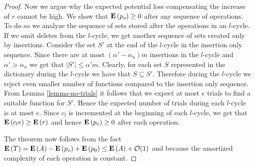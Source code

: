 \begin{proof}
Now we argue why the expected potential loss compensating the increase of $r$ cannot be high.
We show that $\mathbf{E}\left(p_o\right) \geq 0$ after any sequence of operations.
To do so we analyze the sequence of sets stored after the operations in an $l$-cycle.
If we omit deletes from the $l$-cycle, we get another sequence of sets created only by insertions.
Consider the set $S'$ at the end of the $l$-cycle in the insertion only sequence. 
Since there are at most $(\alpha' - \alpha_u)m$ insertions in the $l$-cycle and $\alpha' > \alpha_u$ we get that $|S'| \leq \alpha' m$.
Clearly, for each set $S$ represented in the dictionary during the $l$-cycle we have that $S \subseteq S'$. 
Therefore during the $l$-cycle we reject even smaller number of functions compared to the insertion only sequence.
From Lemma \ref{lemma-no-trials} it follows that we expect at most $e$ trials to find a suitable function for $S'$. 
Hence the expected number of trials during each $l$-cycle is at most $e$.
Since $c_l$ is incremented at the beginning of each $l$-cycle, we get that $\mathbf{E}\left(c_l e\right) \geq \mathbf{E}\left(r\right)$ and hence $\mathbf{E}\left(p_o\right) \geq 0$ after each operation.

The theorem now follows from the fact $\mathbf{E}\left(T\right) = \mathbf{E}\left(A\right) - \mathbf{E}\left(p_o\right) + \mathbf{E}\left(p_0\right) \leq \mathbf{E}\left(A\right) + \mathcal{O}(1)$ and because the amortized complexity of each operation is constant.
\end{proof}
